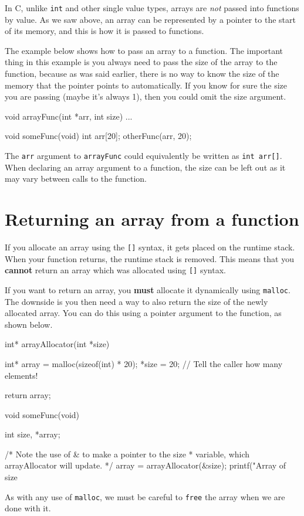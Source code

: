 In C, unlike \texttt{int} and other single value types, arrays are \emph{not} passed into functions by value.
As we saw above, an array can be represented by a pointer to the start of its memory, and this is how it is passed to functions.

The example below shows how to pass an array to a function.
The important thing in this example is you always need to pass the size of the array to the function, because as was said earlier, there is no way to know the size of the memory that the pointer points to automatically.
If you know for sure the size you are passing (maybe it's always 1), then you could omit the size argument.

\begin{codeblock}
void arrayFunc(int *arr, int size) {
    ...
}


void someFunc(void) {
    int arr[20];
    otherFunc(arr, 20);
}
\end{codeblock}

The \lstinline!arr! argument to \lstinline!arrayFunc! could equivalently be written as \lstinline!int arr[]!.
When declaring an array argument to a function, the size can be left out as it may vary between calls to the function.

\section{Returning an array from a function}

If you allocate an array using the \texttt{[]} syntax, it gets placed on the runtime stack.
When your function returns, the runtime stack is removed.
This means that you \textbf{cannot} return an array which was allocated using \texttt{[]} syntax.

If you want to return an array, you \textbf{must} allocate it dynamically using \texttt{malloc}.
The downside is you then need a way to also return the size of the newly allocated array.
You can do this using a pointer argument to the function, as shown below.

\begin{codeblock}
int* arrayAllocator(int *size) {
    int* array = malloc(sizeof(int) * 20);
    *size = 20; // Tell the caller how many elements!

    return array;
}

void someFunc(void) {
    int size, *array;

    /* Note the use of & to make a pointer to the size
     * variable, which arrayAllocator will update.
     */
    array = arrayAllocator(&size);
    printf("Array of size %
}
\end{codeblock}

As with any use of \lstinline!malloc!, we must be careful to \lstinline!free! the array when we are done with it.
